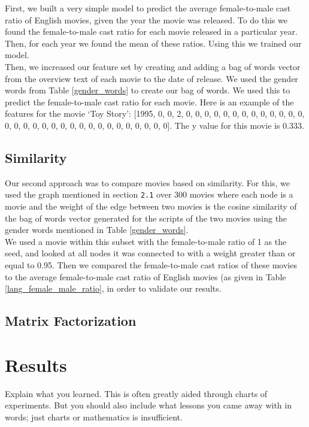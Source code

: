 \documentclass[12pt]{article}
\begin{document}
First, we built a very simple model to predict the average female-to-male cast ratio of English movies, given the year the movie was released. To do this we found the female-to-male cast ratio for each movie released in a particular year. Then, for each year we found the mean of these ratios. Using this we trained our model. \\

Then, we increased our feature set by creating and adding a bag of words vector from the overview text of each movie to the date of release. We used the gender words from Table \ref{gender_words} to create our bag of words. We used this to predict the female-to-male cast ratio for each movie. Here is an example of the features for the movie `Toy Story': [1995, 0, 0, 2, 0, 0, 0, 0, 0, 0, 0, 0, 0, 0, 0, 0, 0, 0, 0, 0, 0, 0, 0, 0, 0, 0, 0, 0, 0, 0, 0, 0, 0, 0, 0]. The y value for this movie is 0.333.

\subsection{Similarity}
Our second approach was to compare movies based on similarity. For this, we used the graph mentioned in section \texttt{2.1} over 300 movies where each node is a movie and the weight of the edge between two movies is the cosine similarity of the bag of words vector generated for the scripts of the two movies using the gender words mentioned in Table \ref{gender_words}. \\

We used a movie within this subset with the female-to-male ratio of 1 as the seed, and looked at all nodes it was connected to with a weight greater than or equal to 0.95. Then we compared the female-to-male cast ratios of these movies to the average female-to-male cast ratio of English movies (as given in Table \ref{lang_female_male_ratio}, in order to validate our results.

\subsection{Matrix Factorization}


\section{Results}

Explain what you learned. This is often greatly aided through charts of experiments. But you should also include what lessons you came away with in words; just charts or mathematics is insufficient.
\end{document}

